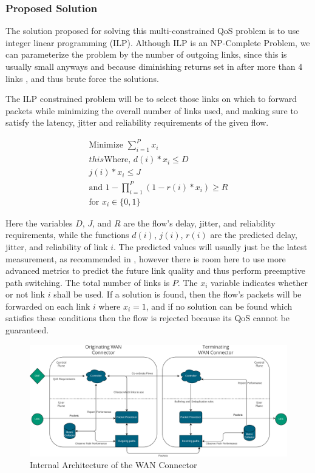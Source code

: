 \subsubsection{Proposed Solution}

The solution proposed for solving this multi-constrained QoS problem is to use integer linear programming (ILP). Although ILP is an NP-Complete Problem, we can parameterize the problem by the number of outgoing links, since this is usually small anyways and because diminishing returns set in after more than 4 links \cite{akella2003measurement}, and thus brute force the solutions.

The ILP constrained problem will be to select those links on which to forward packets while minimizing the overall number of links used, and making sure to satisfy the latency, jitter and reliability requirements of the given flow.

\begin{gather}
\text{Minimize } \sum_{i=1}^{P}x_i \\this
\text{Where, } d(i) * x_i\le D \\
j(i) * x_i \le J \\
\text{and }1 - \prod_{i=1}^{P}{ ( 1- r(i) * x_i ) } \ge R  \\
\text{for } x_i \in \{0,1\}
\end{gather}

Here the variables $D$, $J$, and $R$ are the flow's delay, jitter, and reliability requirements, while the functions $d(i)$, $j(i)$, $r(i)$ are the predicted delay, jitter, and reliability of link $i$. The predicted values will usually just be the latest measurement, as recommended in \cite{akella2008performance}, however there is room here to use more advanced metrics to predict the future link quality and thus perform preemptive path switching. The total number of links is $P$. The $x_i$ variable indicates whether or not link $i$ shall be used. If a solution is found, then the flow's packets will be forwarded on each link $i$ where $x_i = 1$, and if no solution can be found which satisfies these conditions then the flow is rejected because its QoS cannot be guaranteed.

\begin{figure}[h]
    \centering
        \includegraphics[width=\textwidth]{fig/be-architecture.png}
        \caption{Internal Architecture of the WAN Connector}
        \label{fig:arch}
\end{figure}

